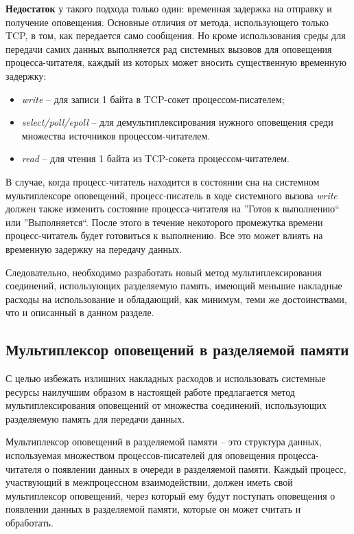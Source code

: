 \textbf{Недостаток} у такого подхода только один: временная задержка на отправку и получение оповещения. Основные отличия от метода, использующего только TCP, в том, как передается само сообщения. Но кроме использования среды для передачи самих данных выполняется рад системных вызовов для оповещения процесса-читателя, каждый из которых может вносить существенную временную задержку:
\begin{itemize}
\item \textit{write} -- для записи 1 байта в TCP-сокет процессом-писателем;
\item \textit{select/poll/epoll} -- для демультиплексирования нужного оповещения среди множества источников процессом-читателем.
\item \textit{read} -- для чтения 1 байта из TCP-сокета процессом-читателем.
\end{itemize}

В случае, когда процесс-читатель находится в состоянии сна на системном мультиплексоре оповещений, процесс-писатель в ходе системного вызова \textit{write} должен также изменить состояние процесса-читателя на ''Готов к выполнению`` или ''Выполняется``. После этого в течение некоторого промежутка времени процесс-читатель будет готовиться к выполнению. Все это может влиять на временную задержку на передачу данных.

Следовательно, необходимо разработать новый метод мультиплексирования соединений, использующих разделяемую память, имеющий меньшие накладные расходы на использование и обладающий, как минимум, теми же достоинствами, что и описанный в данном разделе. 

\subsection{Мультиплексор оповещений в разделяемой памяти}\label{chapter31:Mux}

С целью избежать излишних накладных расходов и использовать системные ресурсы наилучшим образом в настоящей работе предлагается метод мультиплексирования оповещений от множества соединений, использующих разделяемую память для передачи данных.

Мультиплексор оповещений в разделяемой памяти -- это структура данных, используемая множеством процессов-писателей для оповещения процесса-читателя о появлении данных в очереди в разделяемой памяти. Каждый процесс, участвующий в межпроцессном взаимодействии, должен иметь свой мультиплексор оповещений, через который ему будут поступать оповещения о появлении данных в разделяемой памяти, которые он может считать и обработать.

